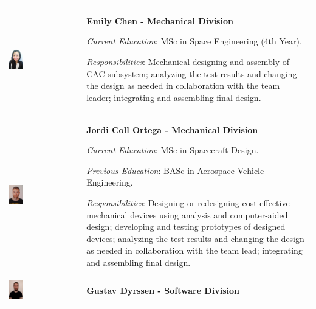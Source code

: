 \documentclass[a4paper,12pt,twoside]{article}
\begin{document}
\begin{longtable}[]{m{} m{}}
\includegraphics[width=0.2\textwidth]{1-introduction/img/emily-chen.jpeg} & \textbf{Emily Chen - Mechanical Division}

\smallskip
\textit{Current Education}: MSc in Space Engineering (4th Year).


\smallskip
\textit{Responsibilities}: Mechanical designing and assembly of CAC subsystem; analyzing the test results and changing the design as needed in collaboration with the team leader; integrating and assembling final design. 
\bigskip
\\

\includegraphics[width=0.2\textwidth]{1-introduction/img/jordi-coll-ortega.jpg} & \textbf{Jordi Coll Ortega - Mechanical Division}

\smallskip
\textit{Current Education}: MSc in Spacecraft Design.

\smallskip
\textit{Previous Education}: BASc in Aerospace Vehicle Engineering.

\smallskip
\textit{Responsibilities}: Designing or redesigning cost-effective mechanical devices using analysis and computer-aided design; developing and testing prototypes of designed devices; analyzing the test results and changing the design as needed in collaboration with the team lead; integrating and assembling final design.
\bigskip
\\

\includegraphics[width=0.2\textwidth]{1-introduction/img/gustav-dryssen.jpg} & \textbf{Gustav Dyrssen - Software Division}


\end{longtable}
\end{document}
